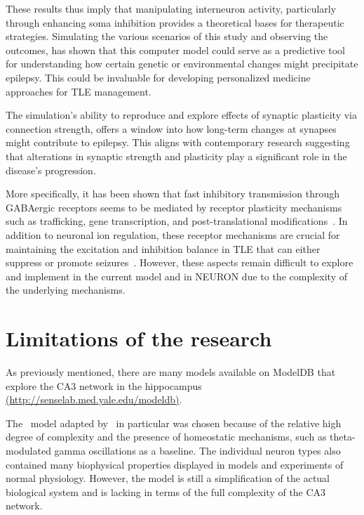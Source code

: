 These results thus imply that manipulating interneuron activity, particularly through enhancing soma inhibition provides a theoretical bases for therapeutic strategies.
Simulating the various scenarios of this study and observing the outcomes, has shown that this computer model could serve as a predictive tool for understanding how certain genetic
or environmental changes might precipitate epilepsy. This could be invaluable for developing personalized medicine approaches for TLE management.

The simulation's ability to reproduce and explore effects of synaptic plasticity via connection strength, offers a window into how long-term changes
at synapses might contribute to epilepsy. This aligns with contemporary research suggesting that alterations in synaptic strength and
plasticity play a significant role in the disease's progression.

More specifically, it has been shown that fast inhibitory transmission through GABAergic receptors seems to be mediated by
receptor plasticity mechanisms such as trafficking, gene transcription, and post-translational modifications~\parencite{fritschyEpilepsyBalanceGABAA2008}.
In addition to neuronal ion regulation, these receptor mechanisms are crucial for maintaining the excitation and inhibition balance in TLE that can either suppress or promote seizures~\parencite{kailaGABAActionsIonic2014a}.
However, these aspects remain difficult to explore and implement in the current model and in NEURON due to the complexity of the underlying mechanisms.

\section{Limitations of the research}
As previously mentioned, there are many models available on ModelDB that explore the CA3 network in the hippocampus
\href{http://senselab.med.yale.edu/modeldb}{(\url{http://senselab.med.yale.edu/modeldb})}.

The~\textcite{neymotinKetamineDisruptsTheta2011} model adapted by~\textcite{sanjayImpairedDendriticInhibition2015} in particular was chosen
because of the relative high degree of complexity and the presence of homeostatic mechanisms, such as theta-modulated gamma oscillations
as a baseline. The individual neuron types also contained many biophysical properties displayed in models and experiments of normal physiology.
However, the model is still a simplification of the actual biological system and is lacking in terms of the full complexity of the CA3 network.

